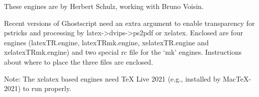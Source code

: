 
These engines are by Herbert Schulz, working with Bruno Voisin.

Recent versions of Ghostscript need an extra argument to enable transparency for pstricks
and processing by latex->dvips->ps2pdf or xelatex. Enclosed are four engines 
(latexTR.engine, latexTRmk.engine, xelatexTR.engine and xelatexTRmk.engine) 
and two special rc file for the `mk' engines. Instructions about where to place the 
three files are enclosed. 

Note: The xelatex based engines need TeX Live 2021 (e.g., installed by MacTeX-2021) to run properly.